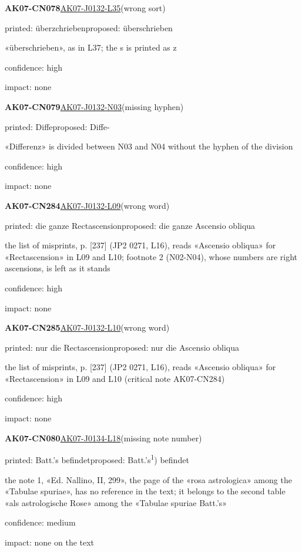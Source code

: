 \documentclass[11pt]{article}
\begin{document}
\noindent\textbf{AK07-CN078}\enspace\hyperlink{AK07-J0132-L35}{AK07-J0132-L35}\enspace(wrong sort)\par\noindent printed: überzchrieben\enspace proposed: überschrieben\par\noindent «überschrieben», as in L37; the s is printed as z\par\noindent confidence: high\par\noindent impact: none\par\medskip
\noindent\textbf{AK07-CN079}\enspace\hyperlink{AK07-J0132-N03}{AK07-J0132-N03}\enspace(missing hyphen)\par\noindent printed: Diffe\enspace proposed: Diffe-\par\noindent «Differenz» is divided between N03 and N04 without the hyphen of the division\par\noindent confidence: high\par\noindent impact: none\par\medskip
\noindent\textbf{AK07-CN284}\enspace\hyperlink{AK07-J0132-L09}{AK07-J0132-L09}\enspace(wrong word)\par\noindent printed: die ganze Rectascension\enspace proposed: die ganze Ascensio obliqua\par\noindent the list of misprints, p. [237] (JP2 0271, L16), reads «Ascensio obliqua» for «Rectascension» in L09 and L10; footnote 2 (N02-N04), whose numbers are right ascensions, is left as it stands\par\noindent confidence: high\par\noindent impact: none\par\medskip
\noindent\textbf{AK07-CN285}\enspace\hyperlink{AK07-J0132-L10}{AK07-J0132-L10}\enspace(wrong word)\par\noindent printed: nur die Rectascension\enspace proposed: nur die Ascensio obliqua\par\noindent the list of misprints, p. [237] (JP2 0271, L16), reads «Ascensio obliqua» for «Rectascension» in L09 and L10 (critical note AK07-CN284)\par\noindent confidence: high\par\noindent impact: none\par\medskip
\noindent\textbf{AK07-CN080}\enspace\hyperlink{AK07-J0134-L18}{AK07-J0134-L18}\enspace(missing note number)\par\noindent printed: Batt.’s befindet\enspace proposed: Batt.’s\textsuperscript{1}) befindet\par\noindent the note 1, «Ed. Nallino, II, 299», the page of the «rosa astrologica» among the «Tabulae spuriae», has no reference in the text; it belongs to the second table «als astrologische Rose» among the «Tabulae spuriae Batt.’s»\par\noindent confidence: medium\par\noindent impact: none on the text\par\medskip
\end{document}
